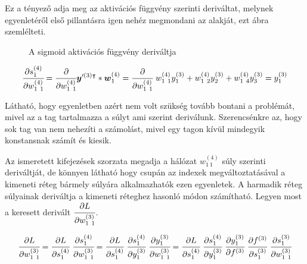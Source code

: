 Ez a tényező adja meg az aktivációs függvény szerinti deriváltat, melynek egyenletéről első pillantásra igen nehéz megmondani az alakját, ezt  ábra szemlélteti.

 \begin{figure}[H]
        \centering
	\caption{A sigmoid aktivációs függvény deriváltja \label{sigderiv}}
\end{figure}

\begin{equation}
    \cfrac{\partial s^{(4)}_{1}}{\partial w^{(4)}_{1~1}} = \cfrac{\partial }{\partial w^{(4)}_{1~1}} \boldsymbol y'^{(3) \intercal}* \boldsymbol w^{(4)}_1= \cfrac{\partial }{\partial w^{(4)}_{1~1}}~ w^{(4)}_{1~1}y^{(3)}_{1} + w^{(4)}_{1~2}y^{(3)}_{2} + w^{(4)}_{1~4}y^{(3)}_{3} = y^{(3)}_{1}
    \label{weightderiv}
\end{equation}

Látható, hogy  egyenletben azért nem volt szükség tovább bontani a problémát, mivel az a tag tartalmazza a súlyt ami szerint deriválunk. Szerencsénkre az, hogy sok tag van nem nehezíti a számolást, mivel egy tagon kívül mindegyik konstansnak számít és kiesik.

Az ismeretett kifejezések szorzata megadja a hálózat  $w^{(4)}_{1~1}$ súly szerinti deriváltját, de könnyen látható hogy csupán az indexek megváltoztatásával a kimeneti réteg bármely súlyára alkalmazhatók ezen egyenletek. A harmadik réteg súlyainak deriváltja a kimeneti réteghez hasonló módon számítható. Legyen most a keresett derivált $\cfrac{\partial L}{\partial w^{(3)}_{1~1}}$.

\begin{equation}
    \cfrac{\partial L}{\partial w^{(3)}_{1~1}} = \cfrac{\partial L}{\partial s^{(4)}_{1}}~\cfrac{\partial s^{(4)}_{1}}{\partial  w^{(3)}_{1~1}} = \cfrac{\partial L}{\partial s^{(4)}_{1}}~\cfrac{\partial s^{(4)}_{1}}{\partial y^{(3)}_1}~\cfrac{\partial y^{(3)}_1}{\partial  w^{(3)}_{1~1}} = 
    \cfrac{\partial L}{\partial s^{(4)}_{1}}~\cfrac{\partial s^{(4)}_{1}}{\partial y^{(3)}_1}~\cfrac{\partial y^{(3)}_1}{\partial f^{(3)}}~\cfrac{\partial f^{(3)}}{\partial s^{(3)}_{1}}~\cfrac{\partial s^{(3)}_{1}}{\partial  w^{(3)}_{1~1}}
    \label{derivoutputlayer}
\end{equation}

